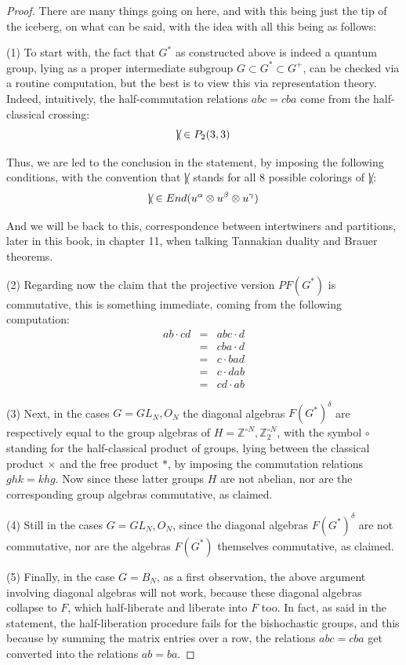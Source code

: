 \documentclass[12pt]{amsbook}
\begin{document}
\begin{proof}
There are many things going on here, and with this being just the tip of the iceberg, on what can be said, with the idea with all this being as follows:

\medskip

(1) To start with, the fact that $G^*$ as constructed above is indeed a quantum group, lying as a proper intermediate subgroup $G\subset G^*\subset G^+$, can be checked via a routine computation, but the best is to view this via representation theory. Indeed, intuitively, the half-commutation relations $abc=cba$ come from the half-classical crossing:
$$\slash\hskip-2.0mm\backslash\hskip-1.7mm|\hskip0.5mm\in P_2(3,3)$$

Thus, we are led to the conclusion in the statement, by imposing the following conditions, with the convention that $\slash\hskip-2.0mm\backslash\hskip-1.7mm|\hskip0.5mm$ stands for all 8 possible colorings of $\slash\hskip-2.0mm\backslash\hskip-1.7mm|\hskip0.5mm$:
$$\slash\hskip-2.0mm\backslash\hskip-1.7mm|\hskip0.5mm\in End(u^\alpha\otimes u^\beta\otimes u^\gamma)$$

And we will be back to this, correspondence between intertwiners and partitions, later in this book, in chapter 11, when talking Tannakian duality and Brauer theorems.

\medskip

(2) Regarding now the claim that the projective version $PF(G^*)$ is commutative, this is something immediate, coming from the following computation:
\begin{eqnarray*}
ab\cdot cd
&=&abc\cdot d\\
&=&cba\cdot d\\
&=&c\cdot bad\\
&=&c\cdot dab\\
&=&cd\cdot ab
\end{eqnarray*}

(3) Next, in the cases $G=GL_N,O_N$ the diagonal algebras $F(G^*)^\delta$ are respectively equal to the group algebras of $H=\mathbb Z^{\circ N},\mathbb Z_2^{\circ N}$, with the symbol $\circ$ standing for the half-classical product of groups, lying between the classical product $\times$ and the free product $*$, by imposing the commutation relations $ghk=khg$. Now since these latter groups $H$ are not abelian, nor are the corresponding group algebras commutative, as claimed.

\medskip

(4) Still in the cases $G=GL_N,O_N$, since the diagonal algebras $F(G^*)^\delta$ are not commutative, nor are the algebras $F(G^*)$ themselves commutative, as claimed.

\medskip

(5) Finally, in the case $G=B_N$, as a first observation, the above argument involving diagonal algebras will not work, because these diagonal algebras collapse to $F$, which half-liberate and liberate into $F$ too. In fact, as said in the statement, the half-liberation procedure fails for the bishochastic groups, and this because by summing the matrix entries over a row, the relations $abc=cba$ get converted into the relations $ab=ba$.
\end{proof}
\end{document}
